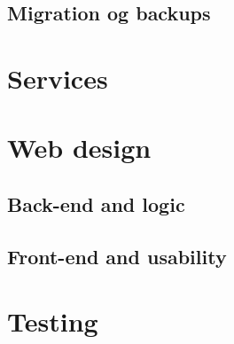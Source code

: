 \subsection{Migration og backups}\label{sec:migration}

\section{Services}\label{sec:servicesImp}


\section{Web design}\label{sec:webdesign}
\subsection{Back-end and logic}\label{sec:backend}
\subsection{Front-end and usability}\label{sec:frontend}


\section{Testing}\label{sec:testing}